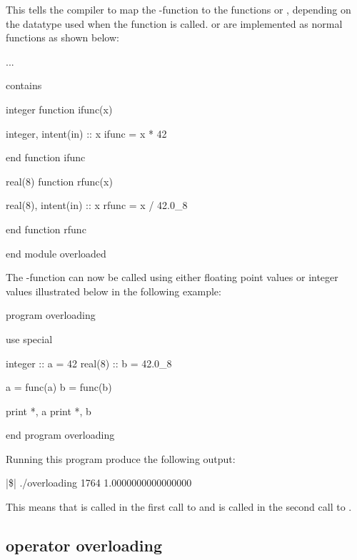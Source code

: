 This tells the compiler to map the -function to the functions  or , depending on the datatype used when the function is called.  or  are implemented as normal functions as shown below:

\begin{fortrancodeenv}
	...
	
contains

integer function ifunc(x)
	
	integer, intent(in) :: x
	ifunc = x * 42
	
end function ifunc

real(8) function rfunc(x)
	
	real(8), intent(in) :: x
	rfunc = x / 42.0_8
	
end function rfunc

end module overloaded
\end{fortrancodeenv}

The -function can now be called using either floating point values or integer values illustrated below in the following example:

\begin{fortrancodeenv}
program overloading

	use special
	
	integer :: a = 42
	real(8) :: b = 42.0_8
	
	a = func(a)
	b = func(b)
	
	print *, a
	print *, b 
	
end program overloading
\end{fortrancodeenv}

Running this program produce the following output:

\cmdmode

\begin{fortrancodeenv}
|\$| ./overloading 
        1764
   1.0000000000000000
\end{fortrancodeenv}

\fmode

This means that  is called in the first call to  and  is called in the second call to .

\subsection{operator overloading}


